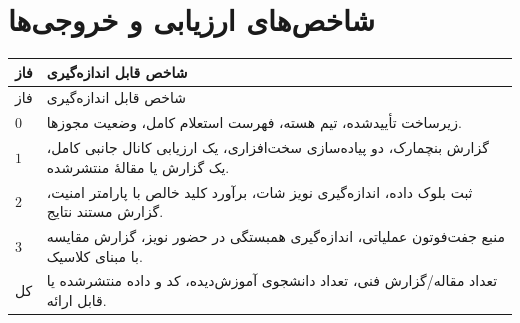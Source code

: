 \section{شاخص‌های ارزیابی و خروجی‌ها}
\begin{longtable}{R{1.98cm}R{13.34cm}}
\toprule {} فاز & شاخص قابل اندازه‌گیری \\ \midrule
\endfirsthead
\toprule {} فاز & شاخص قابل اندازه‌گیری \\ \midrule
\endhead
$0$ & زیرساخت تأییدشده، تیم هسته، فهرست استعلام کامل، وضعیت مجوزها. \\
$1$ & گزارش بنچمارک، دو پیاده‌سازی سخت‌افزاری، یک ارزیابی کانال جانبی کامل، یک گزارش یا مقالهٔ منتشرشده. \\
$2$ & ثبت بلوک داده، اندازه‌گیری نویز شات، برآورد کلید خالص با پارامتر امنیت، گزارش مستند نتایج. \\
$3$ & منبع جفت‌فوتون عملیاتی، اندازه‌گیری همبستگی در حضور نویز، گزارش مقایسه با مبنای کلاسیک. \\
کل & تعداد مقاله/گزارش فنی، تعداد دانشجوی آموزش‌دیده، کد و داده منتشرشده یا قابل ارائه. \\
\bottomrule\end{longtable}


